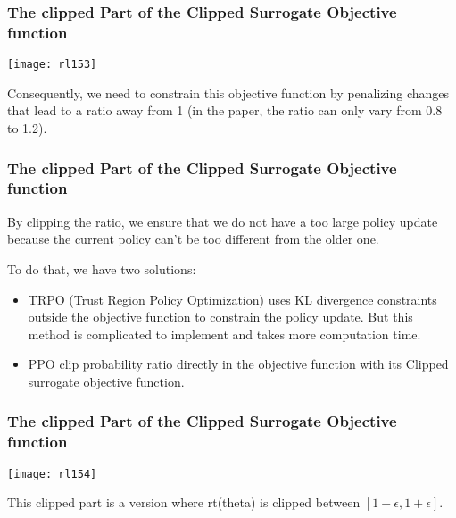 \begin{frame}[fragile]\frametitle{The clipped Part of the Clipped Surrogate Objective function}

\begin{center}
\texttt{[image: rl153]}
\end{center}


Consequently, we need to constrain this objective function by penalizing changes that lead to a ratio away from 1 (in the paper, the ratio can only vary from 0.8 to 1.2).
\end{frame}


\begin{frame}[fragile]\frametitle{The clipped Part of the Clipped Surrogate Objective function}

By clipping the ratio, we ensure that we do not have a too large policy update because the current policy can't be too different from the older one.

To do that, we have two solutions:

\begin{itemize}
\item TRPO (Trust Region Policy Optimization) uses KL divergence constraints outside the objective function to constrain the policy update. But this method is complicated to implement and takes more computation time.
\item PPO clip probability ratio directly in the objective function with its Clipped surrogate objective function.
\end{itemize}


\end{frame}

\begin{frame}[fragile]\frametitle{The clipped Part of the Clipped Surrogate Objective function}

\begin{center}
\texttt{[image: rl154]}
\end{center}


This clipped part is a version where rt(theta) is clipped between $[1 - \epsilon, 1 + \epsilon]$.
\end{frame}

